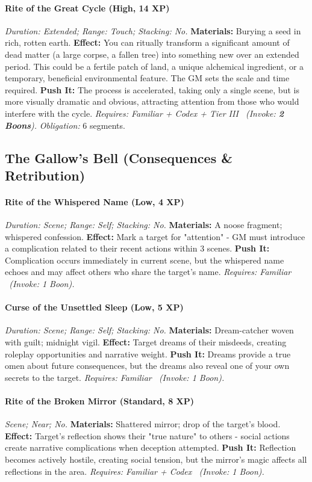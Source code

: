 \paragraph{Rite of the Great Cycle (High, 14 XP)} \emph{Duration: Extended; Range: Touch; Stacking: No.}
\textbf{Materials:} Burying a seed in rich, rotten earth.
\textbf{Effect:} You can ritually transform a significant amount of dead matter (a large corpse, a fallen tree) into something new over an extended period. This could be a fertile patch of land, a unique alchemical ingredient, or a temporary, beneficial environmental feature. The GM sets the scale and time required.
\textbf{Push It:} The process is accelerated, taking only a single scene, but is more visually dramatic and obvious, attracting attention from those who would interfere with the cycle.
\emph{Requires: Familiar + Codex + Tier III \ (\textit{Invoke:} \textbf{2 Boons}).}
\emph{Obligation:} 6 segments.

\subsection{The Gallow's Bell (Consequences \& Retribution)}
\paragraph{Rite of the Whispered Name (Low, 4 XP)} \emph{Duration: Scene; Range: Self; Stacking: No.}
\textbf{Materials:} A noose fragment; whispered confession.
\textbf{Effect:} Mark a target for "attention" - GM must introduce a complication related to their recent actions within 3 scenes.
\textbf{Push It:} Complication occurs immediately in current scene, but the whispered name echoes and may affect others who share the target's name.
\emph{Requires: Familiar \ (\textit{Invoke:} 1 Boon).}
\paragraph{Curse of the Unsettled Sleep (Low, 5 XP)} \emph{Duration: Scene; Range: Self; Stacking: No.}
\textbf{Materials:} Dream-catcher woven with guilt; midnight vigil.
\textbf{Effect:} Target dreams of their misdeeds, creating roleplay opportunities and narrative weight.
\textbf{Push It:} Dreams provide a true omen about future consequences, but the dreams also reveal one of your own secrets to the target.
\emph{Requires: Familiar \ (\textit{Invoke:} 1 Boon).}
\paragraph{Rite of the Broken Mirror (Standard, 8 XP)} \emph{Scene; Near; No.}
\textbf{Materials:} Shattered mirror; drop of the target's blood.
\textbf{Effect:} Target's reflection shows their "true nature" to others - social actions create narrative complications when deception attempted.
\textbf{Push It:} Reflection becomes actively hostile, creating social tension, but the mirror's magic affects all reflections in the area.
\emph{Requires: Familiar + Codex \ (\textit{Invoke:} 1 Boon).}
